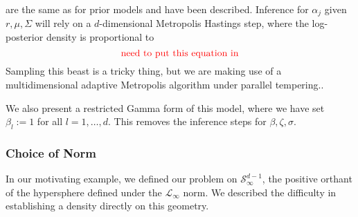   are the same as for prior models and have been described.  Inference for $\alpha_j$ given
  $r, \mu,\Sigma$ will rely on a $d$-dimensional Metropolis Hastings step, where the log-posterior
  density is proportional to
  \begin{equation}
    \label{eqn:dplnlp}
    \text{{\color{red} need to put this equation in}}
  \end{equation}
  Sampling this beast is a tricky thing, but we are making use of a multidimensional adaptive Metropolis
  algorithm  under parallel
  tempering..

We also present a restricted Gamma form of this model, where we have set $\beta_l := 1$ for all
  $l = 1,\ldots,d$.  This removes the inference steps for $\beta,\zeta,\sigma$.


\subsubsection{Choice of Norm}
In our motivating example, we defined our problem on $\mathcal{S}_{\infty}^{d-1}$, the positive orthant
  of the hypersphere defined under the $\mathcal{L}_{\infty}$ norm.  We described the difficulty in
  establishing a density directly on this geometry.  






